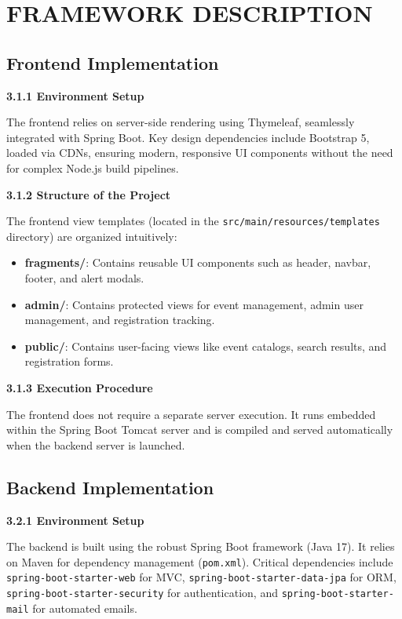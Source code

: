 \documentclass[12pt]{report}
\begin{document}
 
\chapter{FRAMEWORK DESCRIPTION} 
\linespread{1.5} 
\section{Frontend Implementation} 
\textbf{3.1.1 Environment Setup}

The frontend relies on server-side rendering using Thymeleaf, seamlessly integrated with Spring Boot. Key design dependencies include Bootstrap 5, loaded via CDNs, ensuring modern, responsive UI components without the need for complex Node.js build pipelines.

\textbf{3.1.2 Structure of the Project}

The frontend view templates (located in the \texttt{src/main/resources/templates} directory) are organized intuitively:
\begin{itemize}
    \item \textbf{fragments/}: Contains reusable UI components such as header, navbar, footer, and alert modals.
    \item \textbf{admin/}: Contains protected views for event management, admin user management, and registration tracking.
    \item \textbf{public/}: Contains user-facing views like event catalogs, search results, and registration forms.
\end{itemize}

\textbf{3.1.3 Execution Procedure}

The frontend does not require a separate server execution. It runs embedded within the Spring Boot Tomcat server and is compiled and served automatically when the backend server is launched.


\section{Backend Implementation} 

\textbf{3.2.1 Environment Setup}

The backend is built using the robust Spring Boot framework (Java 17). It relies on Maven for dependency management (\texttt{pom.xml}). Critical dependencies include \texttt{spring-boot-starter-web} for MVC, \texttt{spring-boot-starter-data-jpa} for ORM, \texttt{spring-boot-starter-security} for authentication, and \texttt{spring-boot-starter-mail} for automated emails.
\end{document}

